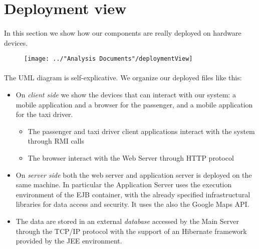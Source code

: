 \section{Deployment view}
\paragraph{}In this section we show how our components are really deployed on hardware devices.
\begin{figure}[H]
	\centering
	\texttt{[image: ../"Analysis Documents"/deploymentView]}
\end{figure}
\paragraph{} The UML diagram is self-explicative. We organize our deployed files like this:
\begin{itemize}
	\item On \textit{client side} we show the devices that can interact with our system: a mobile application and a browser for the passenger, and a mobile application for the taxi driver.
	\begin{itemize}
		\item The passenger and taxi driver client applications interact with the system through RMI calls
		\item The browser interact with the Web Server through HTTP protocol
	\end{itemize}
	\item On \textit{server side} both the web server and application server is deployed on the same machine. In particular the Application Server uses the execution environment of the EJB container, with the already specified infrastructural libraries for data access and security. It uses the also the Google Maps API.
	\item The data are stored in an external \textit{database} accessed by the Main Server through the TCP/IP protocol with the support of an Hibernate framework provided by the JEE environment.
\end{itemize}